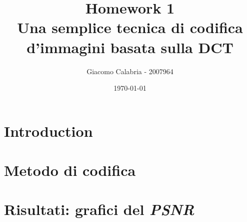 \documentclass{article}
\title{Homework 1\\\textbf{Una semplice tecnica di codifica d'immagini basata sulla DCT}}
\author{Giacomo Calabria - 2007964}
\date{\today}
\begin{document}
    \maketitle
    \section{Introduction}
    
    \clearpage
    \section{Metodo di codifica}
    
    \clearpage
    \section{Risultati: grafici del \textit{PSNR}}
    
\end{document}
